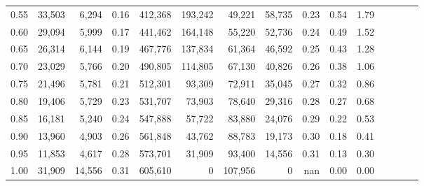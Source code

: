 \begin{tabular}{rrrcrrrrrrrrrrr}
0.55 &  33,503 &   6,294 &                                       0.16 &  412,368 &  193,242 &   49,221 &   58,735 &  0.23 &  0.54 &                         1.79 \\
0.60 &  29,094 &   5,999 &                                       0.17 &  441,462 &  164,148 &   55,220 &   52,736 &  0.24 &  0.49 &                         1.52 \\
0.65 &  26,314 &   6,144 &                                       0.19 &  467,776 &  137,834 &   61,364 &   46,592 &  0.25 &  0.43 &                         1.28 \\
0.70 &  23,029 &   5,766 &                                       0.20 &  490,805 &  114,805 &   67,130 &   40,826 &  0.26 &  0.38 &                         1.06 \\
0.75 &  21,496 &   5,781 &                                       0.21 &  512,301 &   93,309 &   72,911 &   35,045 &  0.27 &  0.32 &                         0.86 \\
0.80 &  19,406 &   5,729 &                                       0.23 &  531,707 &   73,903 &   78,640 &   29,316 &  0.28 &  0.27 &                         0.68 \\
0.85 &  16,181 &   5,240 &                                       0.24 &  547,888 &   57,722 &   83,880 &   24,076 &  0.29 &  0.22 &                         0.53 \\
0.90 &  13,960 &   4,903 &                                       0.26 &  561,848 &   43,762 &   88,783 &   19,173 &  0.30 &  0.18 &                         0.41 \\
0.95 &  11,853 &   4,617 &                                       0.28 &  573,701 &   31,909 &   93,400 &   14,556 &  0.31 &  0.13 &                         0.30 \\
1.00 &  31,909 &  14,556 &                                       0.31 &  605,610 &        0 &  107,956 &        0 &   nan &  0.00 &                         0.00 \\
\bottomrule
\end{tabular}
